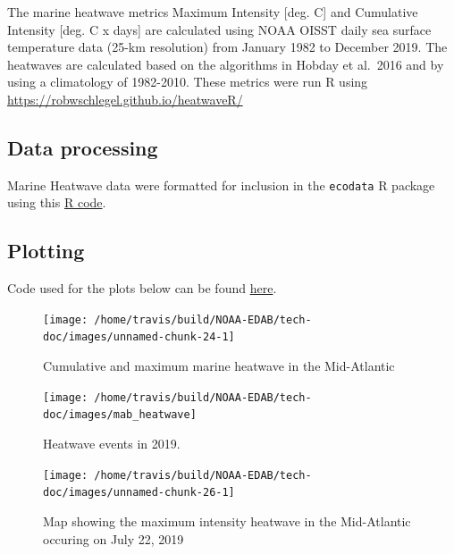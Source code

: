 \documentclass[
]{book}
\begin{document}
The marine heatwave metrics Maximum Intensity {[}deg. C{]} and Cumulative Intensity {[}deg. C x days{]} are calculated using NOAA OISST daily sea surface temperature data (25-km resolution) from January 1982 to December 2019. The heatwaves are calculated based on the algorithms in Hobday et al.~2016 and by using a climatology of 1982-2010. These metrics were run R using \url{https://robwschlegel.github.io/heatwaveR/}

\hypertarget{data-processing-17}{%
\subsection{Data processing}\label{data-processing-17}}

Marine Heatwave data were formatted for inclusion in the \texttt{ecodata} R package using this \href{https://github.com/NOAA-EDAB/ecodata/blob/master/data-raw/get_heatwave.R}{R code}.

\hypertarget{plotting-17}{%
\subsection{Plotting}\label{plotting-17}}

Code used for the plots below can be found \href{https://github.com/NOAA-EDAB/ecodata/blob/master/chunk-scripts/LTL.Rmd-heatwave_mab.R}{here}.

\begin{figure}

{\centering \texttt{[image: /home/travis/build/NOAA-EDAB/tech-doc/images/unnamed-chunk-24-1]} 

}

\caption{Cumulative and maximum marine heatwave in the Mid-Atlantic}\label{fig:unnamed-chunk-24}
\end{figure}

\begin{figure}
\texttt{[image: /home/travis/build/NOAA-EDAB/tech-doc/images/mab\_heatwave]} \caption{Heatwave events in 2019.}\label{fig:unnamed-chunk-25}
\end{figure}

\begin{figure}

{\centering \texttt{[image: /home/travis/build/NOAA-EDAB/tech-doc/images/unnamed-chunk-26-1]} 

}

\caption{Map showing the maximum intensity heatwave in the Mid-Atlantic occuring on July 22, 2019}\label{fig:unnamed-chunk-26}
\end{figure}
\end{document}
